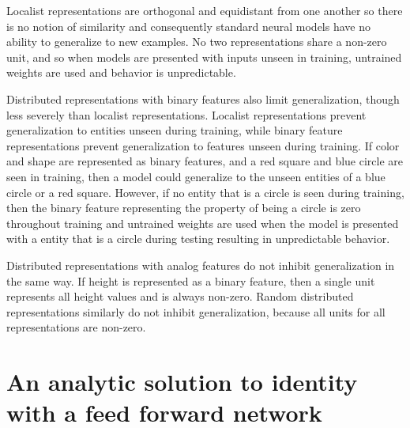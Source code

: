 \documentclass[12pt]{article}
\begin{document}
Localist representations are orthogonal and equidistant from one another so there is no notion of similarity and consequently standard neural models have no ability to generalize to new examples. No two representations share a non-zero unit, and so when models are presented with inputs unseen in training, untrained weights are used and behavior is unpredictable.

Distributed representations with binary features also limit generalization, though less severely than localist representations. Localist representations prevent generalization to entities unseen during training, while binary feature representations prevent generalization to features unseen during training. If color and shape are represented as binary features, and a red square and blue circle are seen in training, then a model could generalize to the unseen entities of a blue circle or a red square. However, if no entity that is a circle is seen during training, then the binary feature representing the property of being a circle is zero throughout training and untrained weights are used when the model is presented with a entity that is a circle during testing resulting in unpredictable behavior.

Distributed representations with analog features do not inhibit generalization in the same way. If height is represented as a binary feature, then a single unit represents all height values and is always non-zero. Random distributed representations similarly do not inhibit generalization, because all units for all representations are non-zero.



\section{An analytic solution to identity with a feed forward network}
\end{document}
